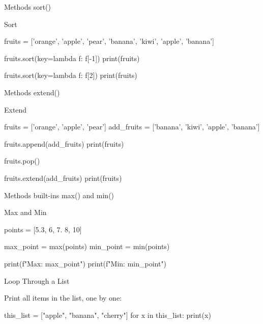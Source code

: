 \documentclass[hyperref={pdfpagelabels=false}]{beamer}
\begin{document}
\begin{frame}[fragile]{Methods sort()}
\begin{exampleblock}{Sort}
\begin{python3}
fruits = ['orange', 'apple', 'pear',
          'banana', 'kiwi', 'apple',
          'banana']

fruits.sort(key=lambda f: f[-1])
print(fruits)

fruits.sort(key=lambda f: f[2])
print(fruits)
\end{python3}
\end{exampleblock}
\end{frame}

\begin{frame}[fragile]{Methods extend()}
\begin{exampleblock}{Extend}
\begin{python3}
fruits = ['orange', 'apple', 'pear']
add_fruits = ['banana', 'kiwi', 'apple', 'banana']

fruits.append(add_fruits)
print(fruits)

fruits.pop()

fruits.extend(add_fruits)
print(fruits)
\end{python3}
\end{exampleblock}
\end{frame}

\begin{frame}[fragile]{Methods built-ins max() and min()}
\begin{exampleblock}{Max and Min}
\begin{python3}
points = [5.3, 6, 7. 8, 10]

max_point = max(points)
min_point = min(points)

print(f"Max: {max_point}")
print(f"Min: {min_point}")
\end{python3}
\end{exampleblock}
\end{frame}

\begin{frame}[fragile]{Loop Through a List}
\begin{exampleblock}{Print all items in the list, one by one:}
\begin{python3}
this_list = ["apple", "banana", "cherry"]
for x in this_list:
    print(x)
\end{python3}
\end{exampleblock}
\end{frame}
\end{document}
